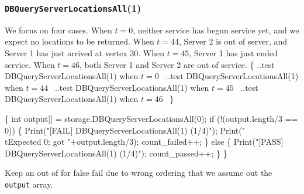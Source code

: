 \documentclass{article}
\def\nwendcode{\endtrivlist \endgroup}
\let\nwdocspar=\par
\begin{document}
\subsubsection{{\tt{}DBQueryServerLocationsAll}(1)}
We focus on four cases. When $t=0$, neither service has begun service yet,
and we expect no locations to be returned. When $t=44$, Server 2 is out of
server, and Server 1 has just arrived at vertex 30. When $t=45$, Server 1
has just ended service. When $t=46$, both Server 1 and Server 2 are out of
service.
\nwenddocs{}\endmoddef{}
\{
  \LA{}..test \code{}DBQueryServerLocationsAll\edoc{}(1) when $t=0$~{\nwtagstyle{}}\RA{}
  \LA{}..test \code{}DBQueryServerLocationsAll\edoc{}(1) when $t=44$~{\nwtagstyle{}}\RA{}
  \LA{}..test \code{}DBQueryServerLocationsAll\edoc{}(1) when $t=45$~{\nwtagstyle{}}\RA{}
  \LA{}..test \code{}DBQueryServerLocationsAll\edoc{}(1) when $t=46$~{\nwtagstyle{}}\RA{}
\}
\nwendcode{}\nwdocspar
\nwenddocs{}\endmoddef{}
\{
  int output[] = storage.DBQueryServerLocationsAll(0);
  if (!(output.length/3 == 0)) \{
    Print("[FAIL] DBQueryServerLocationsAll(1) (1/4)");
    Print("\\tExpected 0; got "+output.length/3);
    count_failed++;
  \} else \{
    Print("[PASS] DBQueryServerLocationsAll(1) (1/4)");
    count_passed++;
  \}
\}
\nwendcode{}\nwdocspar
Keep an out of for false fail due to wrong ordering that we assume out
the {\tt{}output} array.
\nwenddocs{}\endmoddef{}
\end{document}
